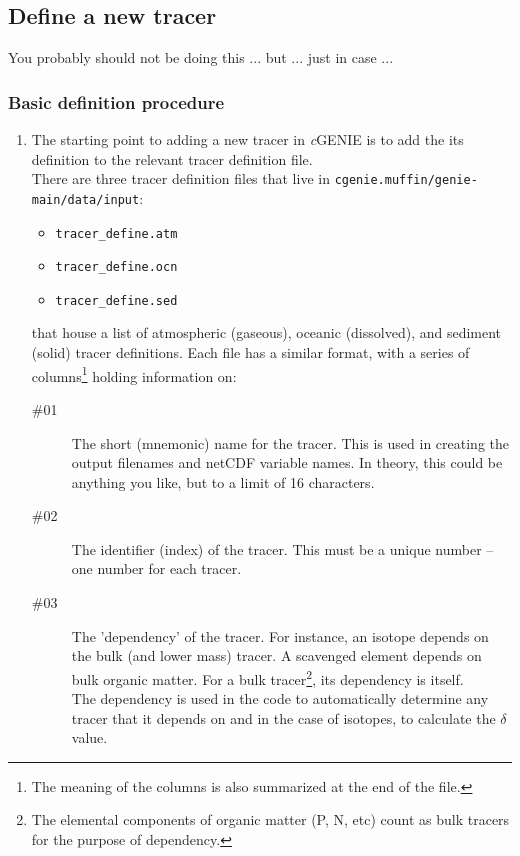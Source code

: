 \documentclass[11pt,fleqn]{book} %
\begin{document}
%
\subsection*{Define a new tracer}\label{Define a new trace}

You probably should not be doing this ... but ... just in case ...

%
\subsubsection{Basic definition procedure}

\begin{enumerate}
\item 
The starting point to adding a new tracer in \textit{c}GENIE is to add the its definition to the relevant tracer definition file.
\\There are three tracer definition files that live in \texttt{cgenie.muffin/genie-main/data/input}:
\begin{itemize}
\item \texttt{tracer\_define.atm}
\item \texttt{tracer\_define.ocn}
\item \texttt{tracer\_define.sed}
\end{itemize}
that house a list of atmospheric (gaseous), oceanic (dissolved), and sediment (solid) tracer definitions.
Each file has a similar format, with a series of columns\footnote{The meaning of the columns is also summarized at the end of the file.} holding information on:
\begin{description}
\item[\#01] The short (mnemonic) name for the tracer. This is used in creating the output filenames and netCDF variable names. In theory, this could be anything you like, but to a limit of 16 characters.
\item[\#02] The identifier (index) of the tracer. This must be a unique number -- one number for each tracer.
\item[\#03] The 'dependency' of the tracer. For instance, an isotope depends on the bulk (and lower mass) tracer. A scavenged element depends on bulk organic matter. For a bulk tracer\footnote{The elemental components of organic matter (P, N, etc) count as bulk tracers for the purpose of dependency.}, its dependency is itself. \\The dependency is used in the code to automatically determine any tracer that it depends on and in the case of isotopes, to calculate the \(\delta\) value.

\end{description}
\end{enumerate}
\end{document}
